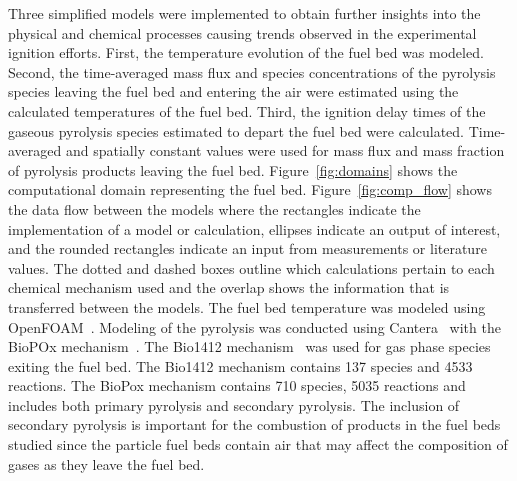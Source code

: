     Three simplified models were implemented to obtain further insights into the physical and chemical processes causing trends observed in the experimental ignition efforts.
    First, the temperature evolution of the fuel bed was modeled. Second, the time-averaged mass flux and species concentrations of the pyrolysis species leaving the fuel bed and entering the air were estimated using the calculated temperatures of the fuel bed. Third, the ignition delay times of the gaseous pyrolysis species estimated to depart the fuel bed were calculated. Time-averaged and spatially constant values were used for mass flux and mass fraction of pyrolysis products leaving the fuel bed. Figure~\ref{fig:domains} shows the computational domain representing the fuel bed. Figure~\ref{fig:comp_flow} shows the data flow between the models where the rectangles indicate the implementation of a model or calculation, ellipses indicate an output of interest, and the rounded rectangles indicate an input from measurements or literature values. The dotted and dashed boxes outline which calculations pertain to each chemical mechanism used and the overlap shows the information that is transferred between the models. The fuel bed temperature was modeled using OpenFOAM~\cite{Foundation2020OpenFOAM}. Modeling of the pyrolysis was conducted using Cantera~\cite{Goodwin2020} with the BioPOx mechanism~\cite{Dhahak2019}. The Bio1412 mechanism~\cite{Ranzi2008, Ranzi2001LumpingMixtures} was used for gas phase species exiting the fuel bed. The Bio1412 mechanism contains 137 species and 4533 reactions. The BioPox mechanism contains 710 species, 5035 reactions and includes both primary pyrolysis and secondary pyrolysis. The inclusion of secondary pyrolysis is important for the combustion of products in the fuel beds studied since the particle fuel beds contain air that may affect the composition of gases as they leave the fuel bed. 

